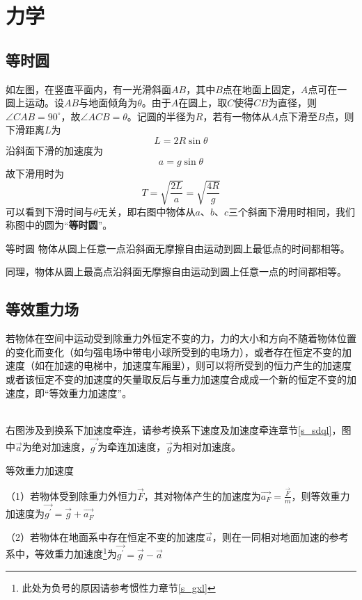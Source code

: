 
\chapter{力学}

\section{等时圆}


如左图，在竖直平面内，有一光滑斜面$AB$，其中$B$点在地面上固定，$A$点可在一圆上运动。设$AB$与地面倾角为$\theta$。由于$A$在圆上，取$C$使得$CB$为直径，则$\angle CAB = 90^{\circ}$，故$\angle ACB = \theta$。记圆的半径为$R$，若有一物体从$A$点下滑至$B$点，则下滑距离$L$为
$$L=2R \sin \theta$$
沿斜面下滑的加速度为
$$a=g \sin \theta$$
故下滑用时为
$$T = \sqrt{\frac{2L}{a}} = \sqrt{\frac{4R}{g}}$$
可以看到下滑时间与$\theta$无关，即右图中物体从$a$、$b$、$c$三个斜面下滑用时相同，我们称图中的圆为“\textbf{等时圆}”。

\begin{theo}{等时圆}{}
物体从圆上任意一点沿斜面无摩擦自由运动到圆上最低点的时间都相等。

同理，物体从圆上最高点沿斜面无摩擦自由运动到圆上任意一点的时间都相等。
\end{theo}

\section{等效重力场}
若物体在空间中运动受到除重力外恒定不变的力，力的大小和方向不随着物体位置的变化而变化（如匀强电场中带电小球所受到的电场力），或者存在恒定不变的加速度（如在加速的电梯中，加速度车厢里），则可以将所受到的恒力产生的加速度或者该恒定不变的加速度的矢量取反后与重力加速度合成成一个新的恒定不变的加速度，即“等效重力加速度”。

\begin{minipage}[b]{0.4\linewidth}

\end{minipage}
\hfill
\begin{minipage}[b]{0.4\linewidth}

\end{minipage}
~\\
右图涉及到换系下加速度牵连，请参考换系下速度及加速度牵连章节\eqref{s_sdql}，图中$\vec{a}$为绝对加速度，$\vec{g^{\prime}}$为牵连加速度，$\vec{g}$为相对加速度。
\begin{defi}{等效重力加速度}{}

（1）若物体受到除重力外恒力$\vec{F}$，其对物体产生的加速度为$\vec{a_F} = \frac{\vec{F}}{m}$，则等效重力加速度为$\vec{g^{\prime}} = \vec{g} + \vec{a_F}$

（2）若物体在地面系中存在恒定不变的加速度$\vec{a}$，则在一同相对地面加速的参考系中，等效重力加速度\footnote{此处为负号的原因请参考惯性力章节\eqref{s_gxl}}为$\vec{g^{\prime}} = \vec{g} - \vec{a}$
\end{defi}


